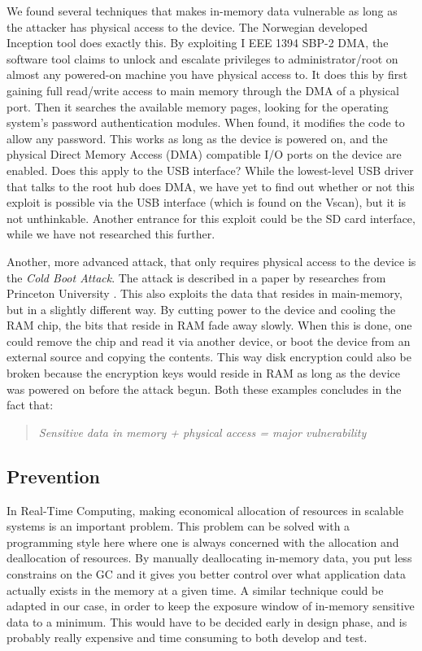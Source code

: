 We found several techniques that makes in-memory data vulnerable as long as the attacker has physical access to the device. The Norwegian developed Inception tool \cite{inception} does exactly this. By exploiting I  EEE 1394 SBP-2 DMA, the software tool claims to unlock and escalate privileges to administrator/root on almost any powered-on machine you have physical access to. It does this by first gaining full read/write access to main memory through the DMA of a physical port. Then it searches the available memory pages, looking for the operating system's password authentication modules. When found, it modifies the code to allow any password. This works as long as the device is powered on, and the physical Direct Memory Access (DMA) compatible I/O ports on the device are enabled. Does this apply to the USB interface? While the lowest-level USB driver that talks to the root hub does DMA, we have yet to find out whether or not this exploit is possible via the USB interface (which is found on the Vscan), but it is not unthinkable. Another entrance for this exploit could be the SD card interface, while we have not researched this further.
 
Another, more advanced attack, that only requires physical access to the device is the \emph{Cold Boot Attack}. The attack is described in a paper by researches from Princeton University \cite{Halderman08leastwe}. This also exploits the data that resides in main-memory, but in a slightly different way. By cutting power to the device and cooling the RAM chip, the bits that reside in RAM fade away slowly. When this is done, one could remove the chip and read it via another device, or boot the device from an external source and copying the contents. This way disk encryption could also be broken because the encryption keys would reside in RAM as long as the device was powered on before the attack begun. Both these examples concludes in the fact that:

\begin{quote} 
\textit{Sensitive data in memory + physical access = major vulnerability}
\end{quote}

\subsection{Prevention}
In Real-Time Computing, making economical allocation of resources in scalable systems is an important problem. This problem can be solved with a programming style here where one is always concerned with the allocation and deallocation of resources. By manually deallocating in-memory data, you put less constrains on the GC and it gives you better control over what application data actually exists in the memory at a given time. A similar technique could be adapted in our case, in order to keep the exposure window of in-memory sensitive data to a minimum. This would have to be decided early in design phase, and is probably really expensive and time consuming to both develop and test.